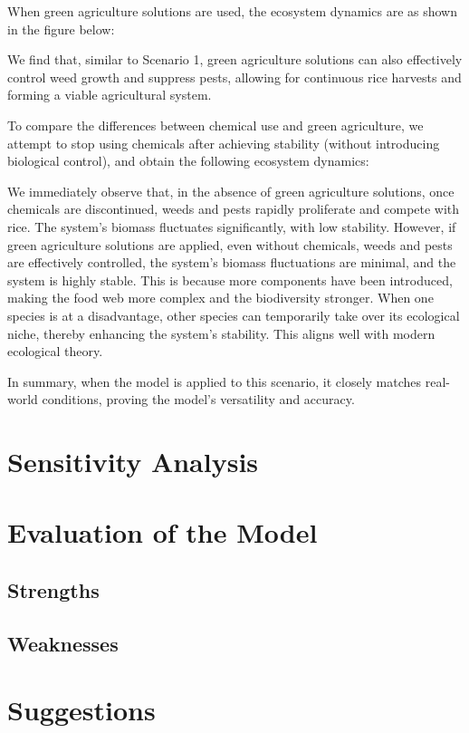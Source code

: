 \documentclass{HZNUMCM}
\begin{document}
        When green agriculture solutions are used, the ecosystem dynamics are as shown in the figure below:
        \begin{figure}[H]
        \end{figure}
        We find that, similar to Scenario 1, green agriculture solutions can also effectively control weed growth and suppress pests, 
        allowing for continuous rice harvests and forming a viable agricultural system.

        To compare the differences between chemical use and green agriculture, 
        we attempt to stop using chemicals after achieving stability (without introducing biological control), 
        and obtain the following ecosystem dynamics:
        \begin{figure}[H]
        \end{figure}
        We immediately observe that, in the absence of green agriculture solutions, 
        once chemicals are discontinued, weeds and pests rapidly proliferate and compete with rice. 
        The system's biomass fluctuates significantly, with low stability. However, 
        if green agriculture solutions are applied, even without chemicals, weeds and pests are effectively controlled, 
        the system's biomass fluctuations are minimal, and the system is highly stable. 
        This is because more components have been introduced, making the food web more complex and the biodiversity stronger. 
        When one species is at a disadvantage, other species can temporarily take over its ecological niche, 
        thereby enhancing the system's stability. This aligns well with modern ecological theory.

        In summary, when the model is applied to this scenario, 
        it closely matches real-world conditions, proving the model's versatility and accuracy.

  \section{Sensitivity Analysis}
  \section{Evaluation of the Model}
    \subsection{Strengths}
    \subsection{Weaknesses}
  \section{Suggestions}


  
\end{document}

